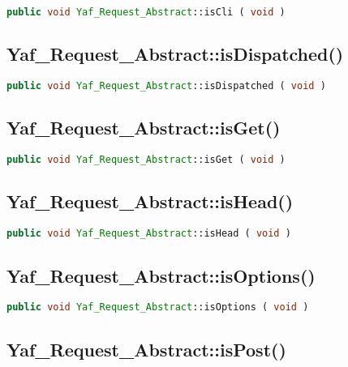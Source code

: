 \begin{lstlisting}[language=PHP]
public void Yaf_Request_Abstract::isCli ( void )
\end{lstlisting}



\subsection{Yaf\_Request\_Abstract::isDispatched()}




\begin{lstlisting}[language=PHP]
public void Yaf_Request_Abstract::isDispatched ( void )
\end{lstlisting}


\subsection{Yaf\_Request\_Abstract::isGet()}




\begin{lstlisting}[language=PHP]
public void Yaf_Request_Abstract::isGet ( void )
\end{lstlisting}




\subsection{Yaf\_Request\_Abstract::isHead()}



\begin{lstlisting}[language=PHP]
public void Yaf_Request_Abstract::isHead ( void )
\end{lstlisting}


\subsection{Yaf\_Request\_Abstract::isOptions()}





\begin{lstlisting}[language=PHP]
public void Yaf_Request_Abstract::isOptions ( void )
\end{lstlisting}


\subsection{Yaf\_Request\_Abstract::isPost()}

